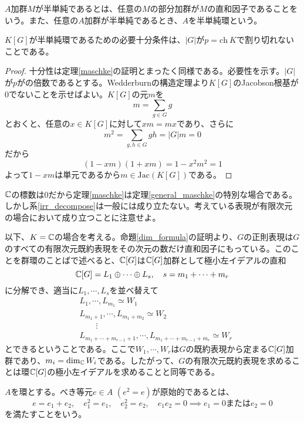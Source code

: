 \documentclass{ltjsreport}
\begin{document}
\begin{defin}
  $A$加群$M$が半単純であるとは、任意の$M$の部分加群が$M$の直和因子であることをいう。また、任意の$A$加群が半単純であるとき、$A$を半単純環という。
\end{defin}

\begin{theo}[Maschkeの定理]\label{general_maschke}
  $K[G]$が半単純環であるための必要十分条件は、$|G|$が$p=\text{ch}\:K$で割り切れないことである。
\end{theo}

\begin{proof}
  十分性は定理\ref{maschke}の証明とまったく同様である。必要性を示す。$|G|$が$p$がの倍数であるとする。Wedderburnの構造定理より$K[G]$のJacobson根基が0でないことを示せばよい。$K[G]$の元$m$を
  \[
  m=\sum_{g\in G}g  
  \]
  とおくと、任意の$x\in K[G]$に対して$xm=mx$であり、さらに
  \[
  m^2=\sum_{g,h\in G}gh=|G|m=0  
  \]
  だから
  \[
  (1-xm)(1+xm)=1-x^2m^2=1  
  \]
  よって$1-xm$は単元であるから$m\in\text{Jac}(K[G])$である。
\end{proof}


$\mathbb{C}$の標数は0だから定理\ref{maschke}は定理\ref{general_maschke}の特別な場合である。しかし系\ref{irr_decompose}は一般には成り立たない。考えている表現が有限次元の場合において成り立つことに注意せよ。

以下、$K=\mathbb{C}$の場合を考える。命題\ref{dim_formula}の証明より、$G$の正則表現は$G$のすべての有限次元既約表現をその次元の数だけ直和因子にもっている。このことを群環のことばで述べると、$\mathbb{C}[G]$は$\mathbb{C}[G]$加群として極小左イデアルの直和
\[
\mathbb{C}[G]=L_1\oplus\cdots\oplus L_s,\quad s=m_1+\cdots+m_r
\]
に分解でき、適当に$L_1,\cdots,L_s$を並べ替えて
\begin{align*}
&L_1,\cdots,L_{m_1}\simeq W_1\\
&L_{m_1+1},\cdots,L_{m_1+m_2}\simeq W_2\\
&\qquad \vdots\\
&L_{m_1+\cdots+m_{r-1}+1},\cdots,L_{m_1+\cdots+m_{r-1}+m_r}\simeq W_r
\end{align*}
とできるということである。ここで$W_1,\cdots,W_r$は$G$の既約表現から定まる$\mathbb{C}[G]$加群であり、$m_i=\dim_{\mathbb{C}}W_i$である。したがって、$G$の有限次元既約表現を求めることは環$\mathbb{C}[G]$の極小左イデアルを求めることと同等である。

\begin{defin}
  $A$を環とする。べき等元$e\in A$ $(e^2=e)$が原始的であるとは、
  \[
  e=e_1+e_2,\quad e_1^2=e_1,\quad e_2^2=e_2,\quad e_1e_2=0\implies e_1=0\text{または}e_2=0 
  \]
  を満たすことをいう。
\end{defin}
\end{document}
